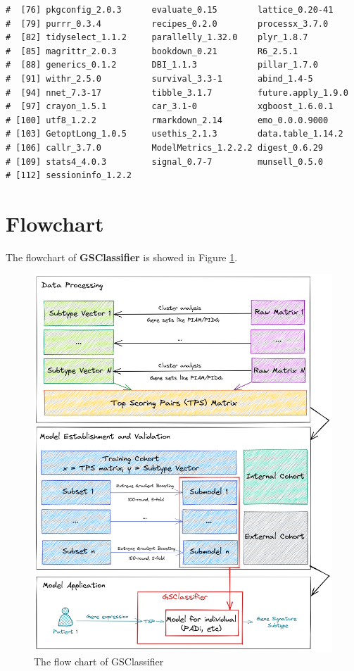 \documentclass[
  12pt,
]{book}
\begin{document}
\begin{verbatim}
#  [76] pkgconfig_2.0.3      evaluate_0.15        lattice_0.20-41     
#  [79] purrr_0.3.4          recipes_0.2.0        processx_3.7.0      
#  [82] tidyselect_1.1.2     parallelly_1.32.0    plyr_1.8.7          
#  [85] magrittr_2.0.3       bookdown_0.21        R6_2.5.1            
#  [88] generics_0.1.2       DBI_1.1.3            pillar_1.7.0        
#  [91] withr_2.5.0          survival_3.3-1       abind_1.4-5         
#  [94] nnet_7.3-17          tibble_3.1.7         future.apply_1.9.0  
#  [97] crayon_1.5.1         car_3.1-0            xgboost_1.6.0.1     
# [100] utf8_1.2.2           rmarkdown_2.14       emo_0.0.0.9000      
# [103] GetoptLong_1.0.5     usethis_2.1.3        data.table_1.14.2   
# [106] callr_3.7.0          ModelMetrics_1.2.2.2 digest_0.6.29       
# [109] stats4_4.0.3         signal_0.7-7         munsell_0.5.0       
# [112] sessioninfo_1.2.2
\end{verbatim}

\hypertarget{flowchart}{%
\section{Flowchart}\label{flowchart}}

The flowchart of \textbf{GSClassifier} is showed in Figure \ref{fig:flowchart}.

\begin{figure}

{\centering \includegraphics[width=0.9\linewidth]{./fig/flowchart} 

}

\caption{The flow chart of GSClassifier}\label{fig:flowchart}
\end{figure}
\end{document}
